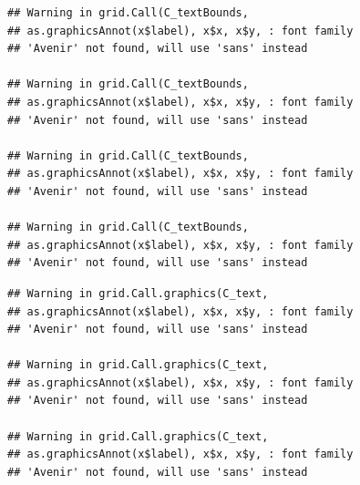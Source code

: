\documentclass[]{krantz}
\begin{document}
\begin{verbatim}
## Warning in grid.Call(C_textBounds,
## as.graphicsAnnot(x$label), x$x, x$y, : font family
## 'Avenir' not found, will use 'sans' instead

## Warning in grid.Call(C_textBounds,
## as.graphicsAnnot(x$label), x$x, x$y, : font family
## 'Avenir' not found, will use 'sans' instead

## Warning in grid.Call(C_textBounds,
## as.graphicsAnnot(x$label), x$x, x$y, : font family
## 'Avenir' not found, will use 'sans' instead

## Warning in grid.Call(C_textBounds,
## as.graphicsAnnot(x$label), x$x, x$y, : font family
## 'Avenir' not found, will use 'sans' instead
\end{verbatim}

\begin{verbatim}
## Warning in grid.Call.graphics(C_text,
## as.graphicsAnnot(x$label), x$x, x$y, : font family
## 'Avenir' not found, will use 'sans' instead

## Warning in grid.Call.graphics(C_text,
## as.graphicsAnnot(x$label), x$x, x$y, : font family
## 'Avenir' not found, will use 'sans' instead

## Warning in grid.Call.graphics(C_text,
## as.graphicsAnnot(x$label), x$x, x$y, : font family
## 'Avenir' not found, will use 'sans' instead
\end{verbatim}
\end{document}
